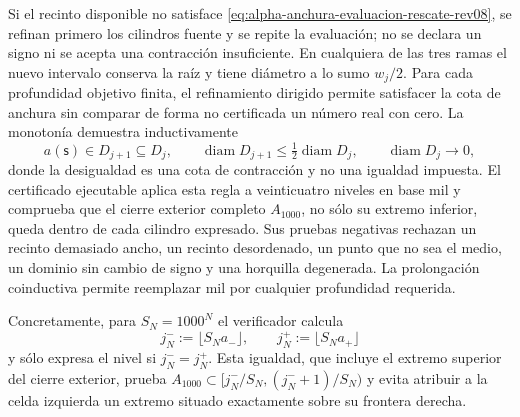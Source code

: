 Si el recinto disponible no satisface
\eqref{eq:alpha-anchura-evaluacion-rescate-rev08}, se refinan primero los
cilindros fuente y se repite la evaluación; no se declara un signo ni se
acepta una contracción insuficiente. En cualquiera de las tres ramas el nuevo
intervalo conserva la raíz y tiene diámetro a lo sumo \(w_j/2\). Para cada
profundidad objetivo finita, el refinamiento dirigido permite satisfacer la
cota de anchura sin comparar de forma no certificada un número real con cero.
La monotonía demuestra inductivamente
\begin{equation}
 a(\mathsf s)\in D_{j+1}\subseteq D_j,\qquad
 \operatorname{diam}D_{j+1}\leq
 \tfrac12\operatorname{diam}D_j,
 \qquad \operatorname{diam}D_j\longrightarrow0,
 \label{eq:alpha-biseccion-racional}
\end{equation}
donde la desigualdad es una cota de contracción y no una igualdad impuesta.
El certificado ejecutable aplica
esta regla a veinticuatro niveles en base mil y comprueba que el cierre
exterior completo \(A_{1000}\), no sólo su extremo inferior, queda dentro de
cada cilindro expresado. Sus pruebas negativas rechazan un recinto demasiado
ancho, un recinto desordenado, un punto que no sea el medio, un dominio sin
cambio de signo y una horquilla degenerada. La prolongación coinductiva permite
reemplazar mil por cualquier profundidad requerida.

Concretamente, para \(S_N=1000^N\) el verificador calcula
\begin{equation}
 j_N^-:=\lfloor S_Na_-\rfloor,
 \qquad j_N^+:=\lfloor S_Na_+\rfloor
 \label{eq:alpha-indices-cilindro-dirigidos-rev08}
\end{equation}
y sólo expresa el nivel si \(j_N^-=j_N^+\). Esta igualdad, que incluye el
extremo superior del cierre exterior, prueba
\(A_{1000}\subset[j_N^-/S_N,(j_N^-+1)/S_N)\) y evita atribuir a la celda
izquierda un extremo situado exactamente sobre su frontera derecha.

